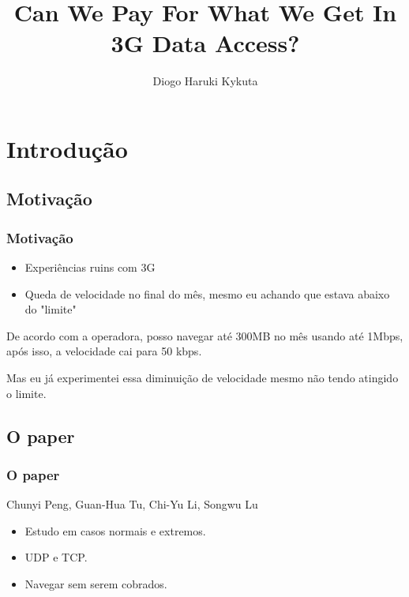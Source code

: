 \documentclass[brazil]{beamer}
\title{Can We Pay For What We Get In 3G Data Access?}
\author{Diogo Haruki Kykuta}
\date{}
\begin{document}
\frame{\titlepage}

\section{Introdução}



\subsection{Motivação}

\begin{frame}[fragile]
    \frametitle{Motivação}
    \begin{itemize}
        \item Experiências ruins com 3G
        \item Queda de velocidade no final do mês, mesmo eu achando que estava abaixo do "limite"
    \end{itemize}
\end{frame}

\begin{frame}[fragile]
    De acordo com a operadora, posso navegar até 300MB no mês usando até 1Mbps, após isso, a velocidade cai
    para 50 kbps.

    \pause
    \vspace{0.4cm}
    Mas eu já experimentei essa diminuição de velocidade mesmo não tendo atingido o limite.
\end{frame}

\subsection{O paper}
\begin{frame}[fragile]
    \frametitle{O paper}
    \begin{center}
        Chunyi Peng, Guan-Hua Tu, Chi-Yu Li, Songwu Lu
    \end{center}
    \vspace{0.4cm}
    \begin{itemize}
        \item Estudo em casos normais e extremos.
        \item UDP e TCP.
        \item Navegar sem serem cobrados.

    \end{itemize}
\end{frame}
\end{document}
